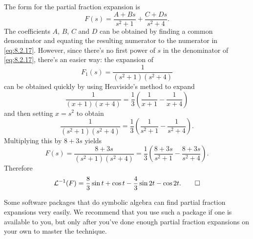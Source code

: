 \begin{solution}
The form for the partial fraction expansion is
\[
F(s)=\frac{A+Bs}{s^2+1}+\frac{C+Ds}{s^2+4}.
\]
The coefficients $A$, $B$, $C$ and $D$ can be obtained by finding a common
denominator and equating the resulting numerator to the numerator in
\eqref{eq:8.2.17}. However, since there's no first power of $s$ in the
denominator of \eqref{eq:8.2.17}, there's an easier way: the expansion of
\[
F_1(s)=\frac{1}{(s^2+1)(s^2+4)}
\]
can be obtained quickly by using Heaviside's method to expand
\[
\frac{1}{(x+1)(x+4)}=\frac{1}{3}\left(\frac{1}{x+1}-\frac{1}{x+4}\right)
\]
and then setting $x=s^2$ to obtain
\[
\frac{1}{(s^2+1)(s^2+4)}=\frac{1}{3}\left(\frac{1}{s^2+1}-\frac{1}{s^2+4}\right).
\]
Multiplying this by $8+3s$ yields
\[
F(s)=\frac{8+3s}{(s^2+1)(s^2+4)}=\frac{1}{3}\left(\frac{8+3s}{s^2+1}-\frac{8+3s}{s^2+4}\right).
\]
Therefore
\[
{\mathcal L}^{-1}(F)=\frac{8}{3}\sin t+\cos t-\frac{4}{3}\sin 2t-\cos 2t.\qedhere
\]
\end{solution}

\technology

\medskip

Some software packages that do symbolic algebra can find partial fraction
expansions
very easily. We recommend that you use such a package if one is available to
you, but only after you've done enough partial fraction expansions on your own
to master the technique.

\exercises

